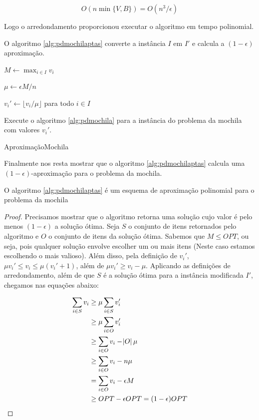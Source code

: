 \begin{equation}
O(n \min\{V,B\}) = O(n^3/ \epsilon)
\end{equation}

Logo o arredondamento proporcionou executar o algoritmo em tempo polinomial.

O algoritmo \ref{alg:pdmochilaptas} converte a instância $I$ em $I'$ e calcula a $(1 - \epsilon)$ aproximação. 

\begin{algorithm}[H]
\SetAlgoLined
{}

$M \leftarrow \max_{i \in I} v_i$ 

$\mu \leftarrow \epsilon M/n$ 

$v_i' \leftarrow \lfloor v_i/ \mu \rfloor$ para todo $i \in I$

Execute o algoritmo \ref{alg:pdmochila} para a instância do problema da mochila com valores $v_i'$.

\caption{AproximaçãoMochila}
\label{alg:pdmochilaptas}
\end{algorithm}

Finalmente nos resta mostrar que o algoritmo \ref{alg:pdmochilaptas} calcula uma $(1-\epsilon)$-aproximação para o problema da mochila.

\begin{teorema}
O algoritmo \ref{alg:pdmochilaptas} é um esquema de aproximação polinomial para o problema da mochila
\end{teorema}

\begin{proof}

Precisamos mostrar que o algoritmo retorna uma solução cujo valor é pelo menos $(1 - \epsilon)$ a solução ótima. Seja $S$ o conjunto de itens retornados pelo algoritmo e $O$ o conjunto de itens da solução ótima. Sabemos que $M \leq OPT$, ou seja, pois qualquer solução envolve escolher um ou mais itens (Neste caso estamos escolhendo o mais valioso). Além disso, pela definição de $v_i'$, $\mu v_i' \leq v_i \leq \mu (v_i'+1)$, além de $\mu v_i' \geq v_i - \mu$. Aplicando as definições de arredondamento, além de que $S$ é a solução ótima para a instância modificada $I'$, chegamos nas equações abaixo:

\begin{align*}
\sum_{i \in S} v_i &\geq \mu \sum_{i \in S}{} v_i'  \\
&\geq \mu \sum_{i \in O} v_i'  \\
&\geq  \sum_{i \in O} v_i - \abs{O} \mu  \\
&\geq \sum_{i \in O} v_i - n \mu  \\
&= \sum_{i \in O} v_i - \epsilon M  \\
&\geq OPT - \epsilon OPT = (1 - \epsilon) OPT
\end{align*}

\end{proof}

